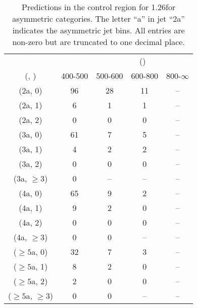 \begin{table}[h!]
\tiny
\centering
\caption{Predictions in the \gj control region for 1.26\ifb for asymmetric categories. The letter ``a'' in jet \eg ``2a''  indicates the asymmetric jet bins. All entries are non-zero but are truncated to one decimal place.\label{tab:predsep_gj_data_asym}}
\begin{tabular}
{ccccc}
	\hline\hline
&	& \multicolumn{4}{c}{\scalht (\gev)} \\ 
	 (\njet,  \nb) & 400-500 & 500-600 & 600-800 & 800-$\infty$ \\ [0.8ex] 
\hline
	(2a, 0) & 96 & 28 & 11 & -- \\[0.5ex] 
	(2a, 1) & 6 & 1 & 1 & -- \\[0.5ex] 
	(2a, 2) & 0 & 0 & 0 & -- \\[0.5ex] 
	(3a, 0) & 61 & 7 & 5 & -- \\[0.5ex] 
	(3a, 1) & 4 & 2 & 2 & -- \\[0.5ex] 
	(3a, 2) & 0 & 0 & 0 & -- \\[0.5ex] 
	(3a, $\ge3$) & 0 & -- & -- & -- \\[0.5ex] 
	(4a, 0) & 65 & 9 & 2 & -- \\[0.5ex] 
	(4a, 1) & 9 & 2 & 0 & -- \\[0.5ex] 
	(4a, 2) & 0 & 0 & 0 & -- \\[0.5ex] 
	(4a, $\ge3$) & 0 & 0 & -- & -- \\[0.5ex] 
	($\ge5$a, 0) & 32 & 7 & 3 & -- \\[0.5ex] 
	($\ge5$a, 1) & 8 & 2 & 0 & -- \\[0.5ex] 
	($\ge5$a, 2) & 2 & 0 & 0 & -- \\[0.5ex] 
	($\ge5$a, $\ge3$) & 0 & 0 & -- & -- \\[0.5ex] 
	\hline
	\hline
\end{tabular}
\end{table}
